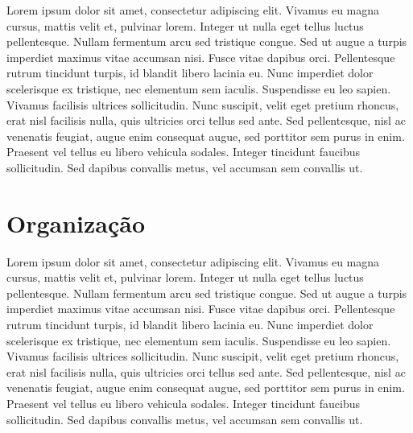 Lorem ipsum dolor sit amet, consectetur adipiscing elit. Vivamus eu magna cursus, mattis velit et, pulvinar lorem. Integer ut nulla eget tellus luctus pellentesque. Nullam fermentum arcu sed tristique congue. Sed ut augue a turpis imperdiet maximus vitae accumsan nisi. Fusce vitae dapibus orci. Pellentesque rutrum tincidunt turpis, id blandit libero lacinia eu. Nunc imperdiet dolor scelerisque ex tristique, nec elementum sem iaculis. Suspendisse eu leo sapien. Vivamus facilisis ultrices sollicitudin. Nunc suscipit, velit eget pretium rhoncus, erat nisl facilisis nulla, quis ultricies orci tellus sed ante. Sed pellentesque, nisl ac venenatis feugiat, augue enim consequat augue, sed porttitor sem purus in enim. Praesent vel tellus eu libero vehicula sodales. Integer tincidunt faucibus sollicitudin. Sed dapibus convallis metus, vel accumsan sem convallis ut.


\section{Organização}
Lorem ipsum dolor sit amet, consectetur adipiscing elit. Vivamus eu magna cursus, mattis velit et, pulvinar lorem. Integer ut nulla eget tellus luctus pellentesque. Nullam fermentum arcu sed tristique congue. Sed ut augue a turpis imperdiet maximus vitae accumsan nisi. Fusce vitae dapibus orci. Pellentesque rutrum tincidunt turpis, id blandit libero lacinia eu. Nunc imperdiet dolor scelerisque ex tristique, nec elementum sem iaculis. Suspendisse eu leo sapien. Vivamus facilisis ultrices sollicitudin. Nunc suscipit, velit eget pretium rhoncus, erat nisl facilisis nulla, quis ultricies orci tellus sed ante. Sed pellentesque, nisl ac venenatis feugiat, augue enim consequat augue, sed porttitor sem purus in enim. Praesent vel tellus eu libero vehicula sodales. Integer tincidunt faucibus sollicitudin. Sed dapibus convallis metus, vel accumsan sem convallis ut.
    




